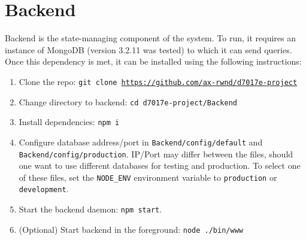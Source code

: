 \section{Backend}
Backend is the state-managing component of the system. To run, it requires an instance of MongoDB (version 3.2.11 was tested) to which it can send queries. Once this dependency is met, it can be installed using the following instructions:
\begin{enumerate}
\item Clone the repo: \texttt{git clone \url{https://github.com/ax-rwnd/d7017e-project}}
\item Change directory to backend: \texttt{cd d7017e-project/Backend}
\item Install dependencies: \texttt{npm i}
\item Configure database address/port in \texttt{Backend/config/default} and \\
\texttt{Backend/config/production}. IP/Port may differ between the files, should one want to use different databases for testing and production. To select one of these files, set the \texttt{NODE\_ENV} environment variable to \texttt{production} or \texttt{development}.
\item Start the backend daemon: \texttt{npm start}.
\item (Optional) Start backend in the foreground: \texttt{node ./bin/www}
\end{enumerate}

